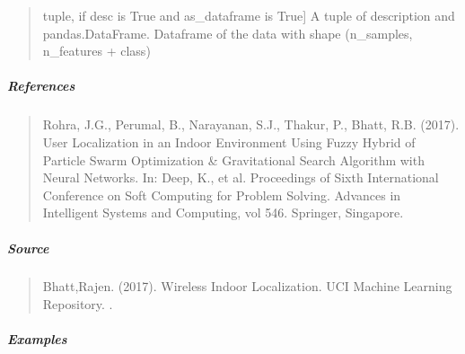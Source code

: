 \documentclass[letterpaper,10pt,english,openany,oneside]{sphinxmanual}
\begin{document}
{{{{\begin{fulllineitems}
\begin{quote}
\begin{description}
\sphinxlineitem{(desc, data)}{[}tuple, if desc is True and as\_dataframe is True{]}
\sphinxAtStartPar
A tuple of description and pandas.DataFrame.
Dataframe of the data with shape (n\_samples, n\_features + class)

\end{description}
\end{quote}


\subparagraph{References}
\label{\detokenize{api_reference/generated/QuadratiK.datasets.load_wireless_data:references}}\begin{quote}

\sphinxAtStartPar
Rohra, J.G., Perumal, B., Narayanan, S.J., Thakur, P., Bhatt, R.B. (2017).
User Localization in an Indoor Environment Using Fuzzy Hybrid of Particle Swarm Optimization
\& Gravitational Search Algorithm with Neural Networks. In: Deep, K., et al. Proceedings of
Sixth International Conference on Soft Computing for Problem Solving. Advances in Intelligent
Systems and Computing, vol 546. Springer, Singapore. 
\end{quote}


\subparagraph{Source}
\label{\detokenize{api_reference/generated/QuadratiK.datasets.load_wireless_data:source}}\begin{quote}

\sphinxAtStartPar
Bhatt,Rajen. (2017). Wireless Indoor Localization. UCI Machine Learning Repository.
.
\end{quote}


\subparagraph{Examples}
\label{\detokenize{api_reference/generated/QuadratiK.datasets.load_wireless_data:examples}}
\begin{sphinxVerbatim}[commandchars=\\\{\}]
   
   
\end{sphinxVerbatim}

\end{fulllineitems}




}}}}
\end{document}
